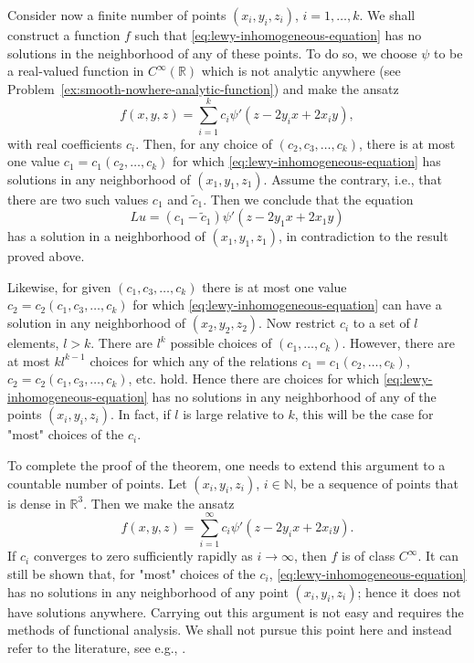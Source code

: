 Consider now a finite number of points $(x_i,y_i,z_i)$, $i=1,\ldots,k$. We shall construct a function $f$ such that \eqref{eq:lewy-inhomogeneous-equation} has no solutions in the neighborhood of any of these points. To do so, we choose $\psi$ to be a real-valued function in $C^\infty(\mathbb{R})$ which is not analytic anywhere (see Problem~\ref{ex:smooth-nowhere-analytic-function}) and make the ansatz
\begin{equation}\label{eq:lewy-finitely-many-forcing-centres}
f(x,y,z)=\sum_{i=1}^kc_i\psi'(z-2y_ix+2x_iy),
\end{equation}
with real coefficients $c_i$. Then, for any choice of $(c_2,c_3,\ldots,c_k)$, there is at most one value $c_1=c_1(c_2,\ldots,c_k)$ for which \eqref{eq:lewy-inhomogeneous-equation} has solutions in any neighborhood of $(x_1,y_1,z_1)$. Assume the contrary, i.e., that there are two such values $c_1$ and $\tilde c_1$. Then we conclude that the equation
\begin{equation}\label{eq:lewy-two-coefficient-contradiction}
Lu=(c_1-\tilde c_1)\psi'(z-2y_1x+2x_1y)
\end{equation}
has a solution in a neighborhood of $(x_1,y_1,z_1)$, in contradiction to the result proved above.

Likewise, for given $(c_1,c_3,\ldots,c_k)$ there is at most one value $c_2=c_2(c_1,c_3,\ldots,c_k)$ for which \eqref{eq:lewy-inhomogeneous-equation} can have a solution in any neighborhood of $(x_2,y_2,z_2)$. Now restrict $c_i$ to a set of $l$ elements, $l>k$. There are $l^k$ possible choices of $(c_1,\ldots,c_k)$. However, there are at most $kl^{k-1}$ choices for which any of the relations $c_1=c_1(c_2,\ldots,c_k)$, $c_2=c_2(c_1,c_3,\ldots,c_k)$, etc. hold. Hence there are choices for which \eqref{eq:lewy-inhomogeneous-equation} has no solutions in any neighborhood of any of the points $(x_i,y_i,z_i)$. In fact, if $l$ is large relative to $k$, this will be the case for "most" choices of the $c_i$.

To complete the proof of the theorem, one needs to extend this argument to a countable number of points. Let $(x_i,y_i,z_i)$, $i\in\mathbb{N}$, be a sequence of points that is dense in $\mathbb{R}^3$. Then we make the ansatz
\begin{equation}\label{eq:lewy-countably-many-forcing-centres}
f(x,y,z)=\sum_{i=1}^{\infty}c_i\psi'(z-2y_ix+2x_iy).
\end{equation}
If $c_i$ converges to zero sufficiently rapidly as $i\to\infty$, then $f$ is of class $C^\infty$. It can still be shown that, for "most" choices of the $c_i$, \eqref{eq:lewy-inhomogeneous-equation} has no solutions in any neighborhood of any point $(x_i,y_i,z_i)$; hence it does not have solutions anywhere. Carrying out this argument is not easy and requires the methods of functional analysis. We shall not pursue this point here and instead refer to the literature, see e.g., \cite{Jo}.

